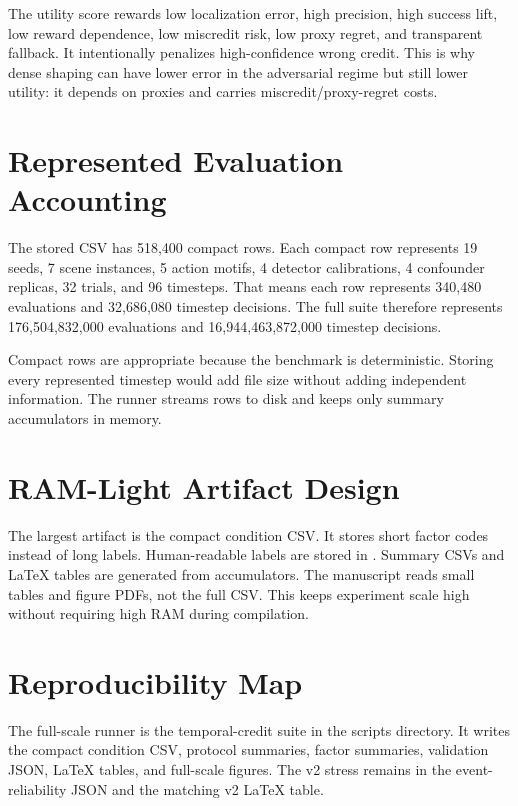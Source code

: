 \documentclass{article}
\begin{document}
The utility score rewards low localization error, high precision, high success lift, low reward dependence, low miscredit risk, low proxy regret, and transparent fallback. It intentionally penalizes high-confidence wrong credit. This is why dense shaping can have lower error in the adversarial regime but still lower utility: it depends on proxies and carries miscredit/proxy-regret costs.

\section{Represented Evaluation Accounting}

The stored CSV has 518,400 compact rows. Each compact row represents 19 seeds, 7 scene instances, 5 action motifs, 4 detector calibrations, 4 confounder replicas, 32 trials, and 96 timesteps. That means each row represents 340,480 evaluations and 32,686,080 timestep decisions. The full suite therefore represents 176,504,832,000 evaluations and 16,944,463,872,000 timestep decisions.

Compact rows are appropriate because the benchmark is deterministic. Storing every represented timestep would add file size without adding independent information. The runner streams rows to disk and keeps only summary accumulators in memory.

\section{RAM-Light Artifact Design}

The largest artifact is the compact condition CSV. It stores short factor codes instead of long labels. Human-readable labels are stored in . Summary CSVs and LaTeX tables are generated from accumulators. The manuscript reads small tables and figure PDFs, not the full CSV. This keeps experiment scale high without requiring high RAM during compilation.

\section{Reproducibility Map}

The full-scale runner is the temporal-credit suite in the scripts directory. It writes the compact condition CSV, protocol summaries, factor summaries, validation JSON, LaTeX tables, and full-scale figures. The v2 stress remains in the event-reliability JSON and the matching v2 LaTeX table.
\end{document}
